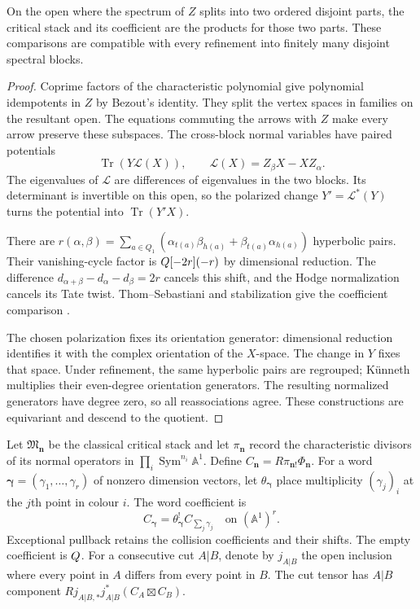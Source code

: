 \begin{proposition}
\label{hall:prop:spectral-factorization}
On the open where the spectrum of $Z$ splits into two ordered
disjoint parts, the critical stack and its coefficient are the
products for those two parts. These comparisons are compatible
with every refinement into finitely many disjoint spectral blocks.
\end{proposition}

\begin{proof}
Coprime factors of the characteristic polynomial give polynomial
idempotents in $Z$ by Bezout's identity. They split the vertex
spaces in families on the resultant open. The equations commuting
the arrows with $Z$ make every arrow preserve these subspaces.
The cross-block normal variables have paired potentials
\[
 \operatorname{Tr}(Y\mathcal L(X)),\qquad
 \mathcal L(X)=Z_\beta X-XZ_\alpha.
\]
The eigenvalues of $\mathcal L$ are differences of eigenvalues
in the two blocks. Its determinant is invertible on this open,
so the polarized change $Y'=\mathcal L^*(Y)$ turns the potential
into $\operatorname{Tr}(Y'X)$.

There are
$r(\alpha,\beta)=\sum_{a\in Q_1}
(\alpha_{t(a)}\beta_{h(a)}+\beta_{t(a)}\alpha_{h(a)})$
hyperbolic pairs. Their vanishing-cycle factor is
$Q[-2r](-r)$ by dimensional reduction. The difference
$d_{\alpha+\beta}-d_\alpha-d_\beta=2r$ cancels this shift,
and the Hodge normalization cancels its Tate twist.
Thom--Sebastiani and stabilization give the coefficient
comparison \cite[Theorems~2.13 and~5.4]{BBDJS2015}.

The chosen polarization fixes its orientation generator: dimensional
reduction identifies it with the complex orientation of the
$X$-space. The change in $Y$ fixes that space. Under refinement,
the same hyperbolic pairs are regrouped; K\"unneth multiplies their
even-degree orientation generators. The resulting normalized
generators have degree zero, so all reassociations agree.
These constructions are equivariant and descend to the quotient.
\end{proof}

Let $\mathfrak M_{\mathbf n}$ be the classical critical stack and
let $\pi_{\mathbf n}$ record the characteristic divisors of its
normal operators in
$\prod_i\operatorname{Sym}^{n_i}\mathbb A^1$. Define
$C_{\mathbf n}=R\pi_{\mathbf n!}\Phi_{\mathbf n}$.
For a word $\boldsymbol\gamma=(\gamma_1,\ldots,\gamma_r)$ of
nonzero dimension vectors, let $\theta_{\boldsymbol\gamma}$
place multiplicity $(\gamma_j)_i$ at the $j$th point in colour $i$.
The word coefficient is
\[
 C_{\boldsymbol\gamma}
 =\theta_{\boldsymbol\gamma}^!C_{\sum_j\gamma_j}
 \quad\text{on }(\mathbb A^1)^r.
\]
Exceptional pullback retains the collision coefficients and their
shifts. The empty coefficient is $Q$. For a consecutive cut
$A|B$, denote by $j_{A|B}$ the open inclusion where every point
in $A$ differs from every point in $B$. The cut tensor has
$A|B$ component
$Rj_{A|B,*}j_{A|B}^*(C_A\boxtimes C_B)$.

